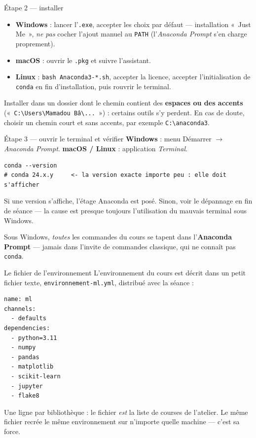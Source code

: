 \documentclass[aspectratio=169,11pt]{beamer}
\begin{document}
\begin{frame}{Étape 2 — installer}
\begin{itemize}\small
  \item \textbf{Windows} : lancer l'\texttt{.exe}, accepter les choix par défaut — installation «~Just Me~», \emph{ne pas} cocher l'ajout manuel au \texttt{PATH} (l'\emph{Anaconda Prompt} s'en charge proprement).
  \item \textbf{macOS} : ouvrir le \texttt{.pkg} et suivre l'assistant.
  \item \textbf{Linux} : \texttt{bash Anaconda3-*.sh}, accepter la licence, accepter l'initialisation de \texttt{conda} en fin d'installation, puis rouvrir le terminal.
\end{itemize}
\begin{ucadpiege}
{\small Installer dans un dossier dont le chemin contient des \textbf{espaces ou des accents} («~\texttt{C:\textbackslash Users\textbackslash Mamadou Bâ\textbackslash...}~») : certains outils s'y perdent. En cas de doute, choisir un chemin court et sans accents, par exemple \texttt{C:\textbackslash anaconda3}.}
\end{ucadpiege}
\end{frame}

\begin{frame}[fragile]{Étape 3 — ouvrir le terminal et vérifier}
{\small \textbf{Windows} : menu Démarrer $\to$ \emph{Anaconda Prompt}. \quad \textbf{macOS / Linux} : application \emph{Terminal}.}
\begin{lstlisting}[style=sh]
conda --version
# conda 24.x.y     <- la version exacte importe peu : elle doit s'afficher
\end{lstlisting}
{\small Si une version s'affiche, l'étage Anaconda est posé. Sinon, voir le dépannage en fin de séance — la cause est presque toujours l'utilisation du mauvais terminal sous Windows.}
\begin{ucadret}
{\small Sous Windows, \emph{toutes} les commandes du cours se tapent dans l'\textbf{Anaconda Prompt} — jamais dans l'invite de commandes classique, qui ne connaît pas \texttt{conda}.}
\end{ucadret}
\end{frame}

\begin{frame}[fragile]{Le fichier de l'environnement}
{\small L'environnement du cours est décrit dans un petit fichier texte, \texttt{environnement-ml.yml}, distribué avec la séance :}
\begin{lstlisting}[style=sh]
name: ml
channels:
  - defaults
dependencies:
  - python=3.11
  - numpy
  - pandas
  - matplotlib
  - scikit-learn
  - jupyter
  - flake8
\end{lstlisting}
{\small Une ligne par bibliothèque : le fichier \emph{est} la liste de courses de l'atelier. Le même fichier recrée le même environnement sur n'importe quelle machine — c'est sa force.}
\end{frame}
\end{document}
